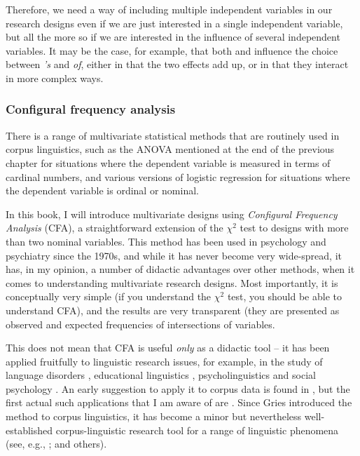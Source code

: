 Therefore, we need a way of including multiple independent variables in our research designs  even if we are just interested in a single independent variable, but all the more so if we are interested in the influence of several independent variables. It may be the case, for example, that both  and  influence the choice between \textit{'s} and \textit{of}, either in that the two effects add up, or in that they interact in more complex ways.

\subsubsection{Configural frequency analysis}

There is a range of multivariate  statistical methods that are routinely used in corpus linguistics, such as the ANOVA mentioned at the end of the previous chapter for situations where the dependent variable is measured  in terms of cardinal  numbers, and various versions of logistic regression for situations where the dependent variable is ordinal  or  nominal.

In this book, I will introduce multivariate  designs  using \textit{Configural Frequency Analysis} (CFA),  a straightforward extension of the $\chi^2$  test to designs with more than two nominal  variables. This method has been used in psychology  and psychiatry since the 1970s, and while it has never become very wide\hyp{}spread, it has, in my opinion, a number of didactic advantages over other methods, when it comes to understanding multivariate  research designs.  Most importantly, it is conceptually very simple (if you understand the $\chi^2$  test, you should be able to understand CFA), and the results are very transparent (they are presented as observed and expected  frequencies of intersections of variables.

This does not mean that CFA  is useful \textit{only} as a didactic tool -- it has been applied fruitfully to linguistic research issues, for example, in the study of language disorders \citep{lautsch_strategische_1988}, educational linguistics \citep{fujioka_views_1997}, psycholinguistics  \citep{hsu_infant_2000} and social psychology  \citep{christmann_components_2000}. An early suggestion to apply it to corpus data is found in \citet{schmilz_zahlen_1983}, but the first actual such applications that I am aware of are \citet{gries_evidence_2002, gries_characteristics_2004}. Since Gries introduced the method to corpus linguistics, it has become a minor but nevertheless well\hyp{}established corpus\hyp{}linguistic research tool for a range of linguistic phenomena (see, e.g., \citealt{stefanowitsch_covarying_2005,kristiansen_channel_2008,liu_is_2010,goschler_beyond_2013,buschfeld_cognitive_2014,hilpert_constructional_2015}; and others).

